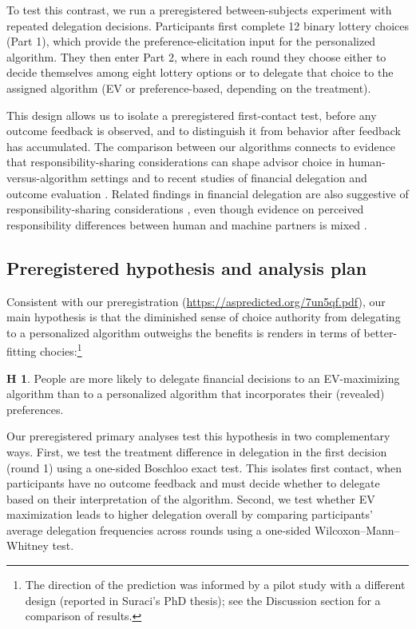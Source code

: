 \documentclass[a4paper, 12pt, fleqn]{article}
\theoremstyle{definition}
\newtheorem{hyp}{H}
\begin{document}
To test this contrast, we run a preregistered between-subjects experiment with repeated delegation decisions. Participants first complete 12 binary lottery choices (Part 1), which provide the preference-elicitation input for the personalized algorithm. They then enter Part 2, where in each round they choose either to decide themselves among eight lottery options or to delegate that choice to the assigned algorithm (EV or preference-based, depending on the treatment). 

This design allows us to isolate a preregistered first-contact test, before any outcome feedback is observed, and to distinguish it from behavior after feedback has accumulated. 
The comparison between our algorithms connects to evidence that responsibility-sharing considerations can shape advisor choice in human-versus-algorithm settings \citep{Gazit2023} and to recent studies of financial delegation and outcome evaluation \citep{Ismagilova2025}. Related findings in financial delegation are also suggestive of responsibility-sharing considerations \citep{Werner2026}, even though evidence on perceived responsibility differences between human and machine partners is mixed \citep{Kirchkamp2019}.

\subsection*{Preregistered hypothesis and analysis plan}
Consistent with our preregistration ({\scriptsize\url{https://aspredicted.org/7un5qf.pdf}}), our main hypothesis is that the diminished sense of choice authority from delegating to a personalized algorithm outweighs the benefits is renders in terms of better-fitting chocies:\footnote{The direction of the prediction was informed by a pilot study with a different design (reported in Suraci's PhD thesis); see the Discussion section for a comparison of results.}
\begin{hyp}
	People are more likely to delegate financial decisions to an EV-maximizing algorithm than to a personalized algorithm that incorporates their (revealed) preferences.
\end{hyp}

Our preregistered primary analyses test this hypothesis in two complementary ways. First, we test the treatment difference in delegation in the first decision (round 1) using a one-sided Boschloo exact test. This isolates first contact, when participants have no outcome feedback and must decide whether to delegate based on their interpretation of the algorithm. Second, we test whether EV maximization leads to higher delegation overall by comparing participants' average delegation frequencies across rounds using a one-sided Wilcoxon--Mann--Whitney test.
\end{document}
